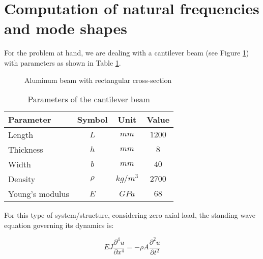 \section{Computation of natural frequencies and mode shapes}
\label{sec:computation_of_natural_frequencies_and_mode_shapes}

For the problem at hand, we are dealing with a cantilever beam (see Figure \ref{fig:beam}) with parameters as shown in Table \ref{tab:beam_parameters}.

\begin{figure}[h]
    \centering
    \caption{Aluminum beam with rectangular cross-section}
    \label{fig:beam}
\end{figure}

\begin{table}[H]
    \centering
    \begin{tabular}{lccc}
        \hline
        Parameter       & Symbol & Unit     & Value  \\
        \hline
        Length          & $L$    & $mm$     & $1200$ \\
        Thickness       & $h$    & $mm$     & $8$    \\
        Width           & $b$    & $mm$     & $40$   \\
        Density         & $\rho$ & $kg/m^3$ & $2700$ \\
        Young's modulus & $E$    & $GPa$    & $68$   \\
        \hline
    \end{tabular}
    \caption{Parameters of the cantilever beam}
    \label{tab:beam_parameters}
\end{table}

For this type of system/structure, considering zero axial-load, the standing wave equation governing its dynamics is:

\begin{equation}
    E J \frac{\partial^4 u}{\partial x^4} = - \rho A \frac{\partial^2 u}{\partial t^2}
\end{equation}

